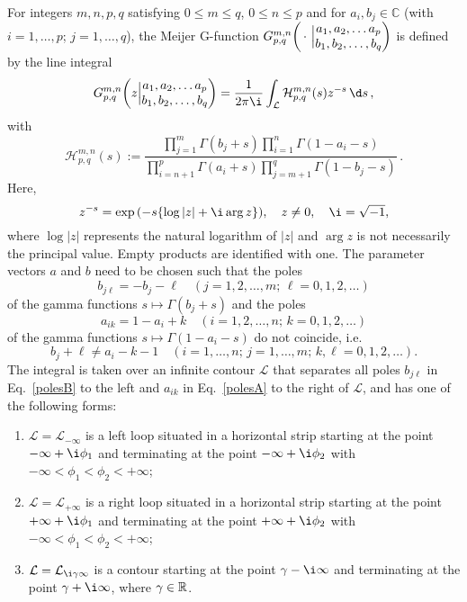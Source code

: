 \begin{definition}\label{Def:MeijerG}
  For integers $m,n,p,q$ satisfying $0\leq m \leq q$, $0 \leq n \leq p$ and for $a_i, b_j \in \mathbb{C}$ (with $i=1,\ldots,p$; $j=1,\ldots,q$), the Meijer G-function
  $G_{p,q}^{m,n}{\left(\, \cdot \,\, \Big| \begin{matrix} a_1,a_2, \ldots a_p \\ b_1, b_2,\ldots, b_q\end{matrix}\right)}$ is defined by the line integral
  \[
    \label{eq:the_G}
    G_{p,q}^{m,n}\roundbra{z \Big| \begin{matrix} a_1,a_2, \ldots a_p \\ b_1, b_2,\ldots, b_q\end{matrix}}
    =
    \frac{1}{2\pi \i} \int_{\mathcal{L}} \mathcal{H}_{p,q}^{m,n} (s) z^{-s} \, \d s \, ,
  \]
  with
  \[\label{Hmnpq}
    \mathcal{H}_{p,q}^{m,n}(s) :=   \frac{\prod_{j=1}^m \Gamma(b_j+s) \prod_{i=1}^n \Gamma(1-a_i-s)}{\prod_{i=n+1}^p \Gamma(a_i+s) \prod_{j=m+1}^q \Gamma(1-b_j-s)}
    \,.
  \]
  Here,
  \[
    z^{-s}=\exp\roundbra{-s \curlybra{\log |z|+ \i \arg z}}, \quad z \neq 0, \quad \i=\sqrt{-1},
  \]
  where $\log|z|$ represents the natural logarithm of $|z|$ and $\arg z$ is not necessarily the principal value.
  Empty products are identified with one.
  The parameter vectors $a$ and $b$ need to be chosen such that the poles
  \[\label{polesB}
    b_{j\ell} = -b_j - \ell \quad (j=1,2,\ldots,m;\, \ell=0,1,2,\ldots)
  \]
  of the gamma functions $s\mapsto \Gamma(b_j+s)$ and the poles
  \[\label{polesA}
    a_{ik} = 1-a_i+k \quad (i=1,2,\ldots,n;\, k=0,1,2,\ldots)
  \]
  of the gamma functions $s\mapsto \Gamma(1-a_i-s)$ do not coincide, i.e.
  \[
    b_j+\ell \neq a_i-k-1 \quad (i=1,\ldots,n;\, j=1,\ldots,m;\,  k,\ell=0,1,2,\ldots).
  \]
  The integral is taken over an infinite contour $\mathcal{L}$ that separates all  poles $b_{j\ell}$ in Eq.~\eqref{polesB} to the left and $a_{ik}$ in Eq.~\eqref{polesA} to the right of $\mathcal{L}$, and has one of the following forms:
  \begin{enumerate}
    \item $\mathcal{L}=\mathcal{L}_{-\infty}$ is a left loop situated in a horizontal strip starting at the point $-\infty+\i \phi_1$ and terminating at the point $-\infty + \i \phi_2$ with $-\infty < \phi_1 < \phi_2 < +\infty$;
    \item $\mathcal{L}=\mathcal{L}_{+\infty}$ is a right loop situated in a horizontal strip starting at the point $+\infty+\i \phi_1$ and terminating at the point $+\infty + \i \phi_2$ with $-\infty < \phi_1 < \phi_2 < +\infty$;
    \item $\mathcal{L}=\mathcal{L}_{\i \gamma \infty}$ is a contour starting at the point $\gamma-\i \infty$ and terminating at the point $\gamma+\i \infty$, where $\gamma \in {\mathbb{R}}$.
  \end{enumerate}
\end{definition}
